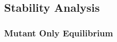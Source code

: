 \documentclass[11pt, oneside]{article}    %
\begin{document}




\subsection{Stability Analysis}
\subsubsection{Mutant Only Equilibrium}


\end{document}
